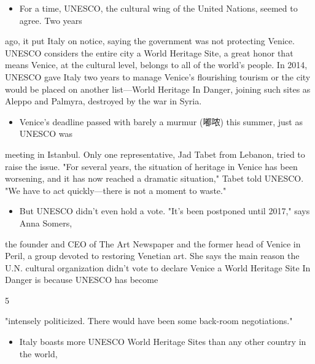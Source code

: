 \documentclass[UTF8,11pt]{ctexart}
\begin{document}
\begin{itemize}[leftmargin=2em,itemsep=.2em,topsep=.4em]\item[F.] For a time, UNESCO, the cultural wing of the United Nations, seemed to agree. Two years
\end{itemize}

ago, it put Italy on notice, saying the government was not protecting Venice. UNESCO considers the entire city a World Heritage Site, a great honor that means Venice, at the cultural level, belongs to all of the world's people. In 2014, UNESCO gave Italy two years to manage Venice's flourishing tourism or the city would be placed on another list—World Heritage In Danger, joining such sites as Aleppo and Palmyra, destroyed by the war in Syria.


\begin{itemize}[leftmargin=2em,itemsep=.2em,topsep=.4em]\item[G.] Venice's deadline passed with barely a murmur (嘟哝) this summer, just as UNESCO was
\end{itemize}

meeting in Istanbul. Only one representative, Jad Tabet from Lebanon, tried to raise the issue. "For several years, the situation of heritage in Venice has been worsening, and it has now reached a dramatic situation," Tabet told UNESCO. "We have to act quickly—there is not a moment to waste."


\begin{itemize}[leftmargin=2em,itemsep=.2em,topsep=.4em]\item[H.] But UNESCO didn't even hold a vote. "It's been postponed until 2017," says Anna Somers,
\end{itemize}

the founder and CEO of The Art Newspaper and the former head of Venice in Peril, a group devoted to restoring Venetian art. She says the main reason the U.N. cultural organization didn't vote to declare Venice a World Heritage Site In Danger is because UNESCO has become


5


"intensely politicized. There would have been some back-room negotiations."


\begin{itemize}[leftmargin=2em,itemsep=.2em,topsep=.4em]\item[I.] Italy boasts more UNESCO World Heritage Sites than any other country in the world,
\end{itemize}
\end{document}
